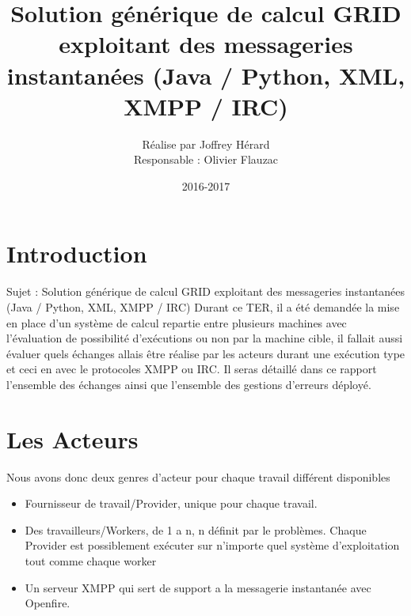\documentclass[11pt]{article}
\begin{document}
 \makeatletter
\def\maketitle{%
  \null
  \thispagestyle{empty}%
  \vfill
  \begin{center}\leavevmode
    \normalfont
    {\Huge \@title\par}%
    \vskip 3cm
    {\Large \@author\par}%
    \vskip 1cm
    {\Large \@date\par}%
  \end{center}%
  \vfill
  \null
  \cleardoublepage
  }
\makeatother
\title{Solution générique de calcul GRID exploitant des messageries instantanées
(Java / Python, XML, XMPP / IRC)}
\author{ Réalise par Joffrey Hérard \begin{center}Responsable : Olivier Flauzac\end{center}}
\date{2016-2017}
\maketitle
 
\tableofcontents 

\newpage
\section{Introduction} 
Sujet : Solution générique de calcul GRID exploitant des messageries instantanées
(Java / Python, XML, XMPP / IRC)
Durant ce TER, il a été demandée la mise en place d'un système de calcul repartie entre plusieurs machines avec l'évaluation de possibilité d'exécutions ou non par la machine cible, il fallait aussi évaluer quels échanges allais être réalise par les acteurs durant une exécution type et ceci en avec le protocoles XMPP ou IRC. Il seras détaillé dans ce rapport l'ensemble des échanges ainsi que l'ensemble des gestions d'erreurs déployé. 
\newpage
\section{Les Acteurs} 
Nous avons donc deux genres d'acteur pour chaque travail différent disponibles 
\begin{itemize}
\item Fournisseur de travail/Provider, unique pour chaque travail.
\item Des travailleurs/Workers, de 1 a n, n définit par le problèmes.
Chaque Provider est possiblement exécuter sur n'importe quel système d'exploitation  tout comme chaque worker
\item Un serveur XMPP qui sert de support a la messagerie instantanée avec Openfire.
\end{itemize}
\newpage
\end{document}
